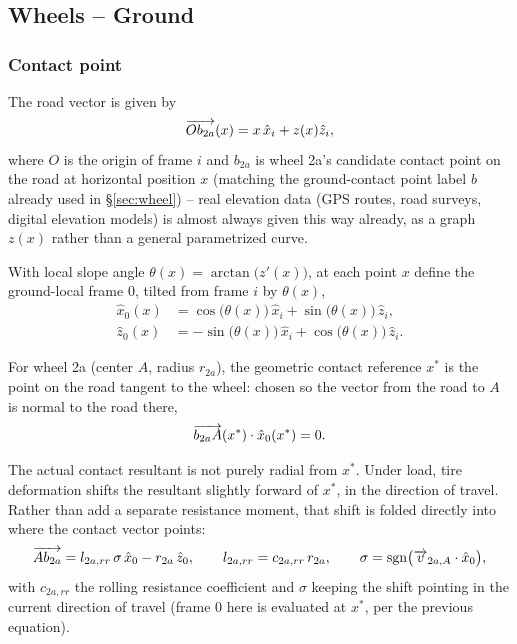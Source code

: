 \subsection{Wheels -- Ground}
\label{sec:wheels-ground}

\subsubsection{Contact point}
The road vector is given by
\begin{equation}
    \overrightarrow{Ob_{2a}}(x) = x\,\hat x_i + z(x)\hat z_i,
\end{equation}
where $O$ is the origin of frame $i$ and $b_{2a}$ is wheel 2a's candidate contact point on the road at horizontal position $x$ (matching the ground-contact point label $b$ already used in \S\ref{sec:wheel}) -- real elevation data (GPS routes, road surveys, digital elevation models) is almost always given this way already, as a graph $z(x)$ rather than a general parametrized curve.

With local slope angle $\theta(x) = \arctan\!\big(z'(x)\big)$, at each point $x$ define the ground-local frame $0$, tilted from frame $i$ by $\theta(x)$,
\begin{align}
    \hat x_0(x) &= \cos\big(\theta(x)\big)\,\hat x_i + \sin\big(\theta(x)\big)\,\hat z_i, \\
    \hat z_0(x) &= -\sin\big(\theta(x)\big)\,\hat x_i + \cos\big(\theta(x)\big)\,\hat z_i.
\end{align}

For wheel 2a (center $A$, radius $r_{2a}$), the geometric contact reference $x^*$ is the point on the road tangent to the wheel: chosen so the vector from the road to $A$ is normal to the road there,
\begin{equation}
    \overrightarrow{b_{2a}A}(x^*) \cdot \hat x_0(x^*) = 0.
\end{equation}

The actual contact resultant is not purely radial from $x^*$. Under load, tire deformation shifts the resultant slightly forward of $x^*$, in the direction of travel. Rather than add a separate resistance moment, that shift is folded directly into where the contact vector points:
\begin{equation}
    \overrightarrow{Ab_{2a}} = l_{2a,rr}\,\sigma\,\hat x_0 - r_{2a}\,\hat z_0, \qquad l_{2a,rr} = c_{2a,rr}\,r_{2a}, \qquad \sigma = \operatorname{sgn}\!\big(\overrightarrow{v}_{2a,A}\cdot\hat x_0\big),
\end{equation}
with $c_{2a,rr}$ the rolling resistance coefficient and $\sigma$ keeping the shift pointing in the current direction of travel (frame $0$ here is evaluated at $x^*$, per the previous equation).

